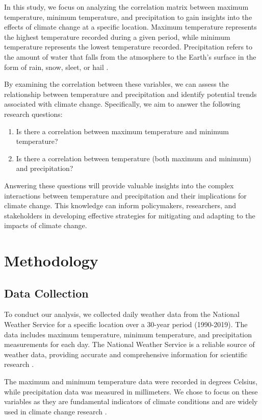 \documentclass{article}
\begin{document}
In this study, we focus on analyzing the correlation matrix between maximum temperature, minimum temperature, and precipitation to gain insights into the effects of climate change at a specific location. Maximum temperature represents the highest temperature recorded during a given period, while minimum temperature represents the lowest temperature recorded. Precipitation refers to the amount of water that falls from the atmosphere to the Earth's surface in the form of rain, snow, sleet, or hail \cite{IPCC2013}.

By examining the correlation between these variables, we can assess the relationship between temperature and precipitation and identify potential trends associated with climate change. Specifically, we aim to answer the following research questions:

\begin{enumerate}
  \item Is there a correlation between maximum temperature and minimum temperature?
  \item Is there a correlation between temperature (both maximum and minimum) and precipitation?
\end{enumerate}

Answering these questions will provide valuable insights into the complex interactions between temperature and precipitation and their implications for climate change. This knowledge can inform policymakers, researchers, and stakeholders in developing effective strategies for mitigating and adapting to the impacts of climate change.
\section{Methodology}

\subsection{Data Collection}
To conduct our analysis, we collected daily weather data from the National Weather Service for a specific location over a 30-year period (1990-2019). The data includes maximum temperature, minimum temperature, and precipitation measurements for each day. The National Weather Service is a reliable source of weather data, providing accurate and comprehensive information for scientific research \cite{NWS}.

The maximum and minimum temperature data were recorded in degrees Celsius, while precipitation data was measured in millimeters. We chose to focus on these variables as they are fundamental indicators of climate conditions and are widely used in climate change research \cite{IPCC}.
\end{document}
